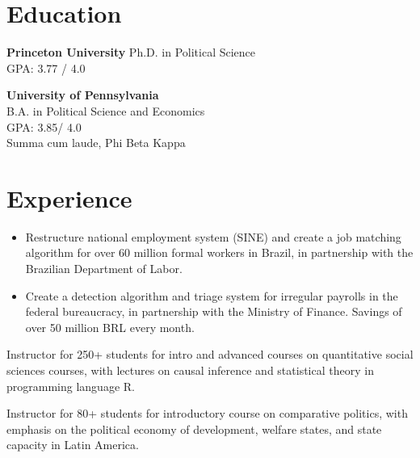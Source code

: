 \documentclass[]{deedy-resume-openfont}
\begin{document}
%
%

%
%

\section{Education}
\textbf{Princeton University}
Ph.D. in Political Science\\
GPA: 3.77 / 4.0
\sectionsep
    
\textbf{University of Pennsylvania}\\
B.A. in Political Science and Economics\\
GPA: 3.85/ 4.0\\
Summa cum laude, Phi Beta Kappa
\sectionsep
    

\section{Experience}
\vspace{\topsep} %
\begin{itemize}
\item Restructure national employment system (SINE) and create a job matching algorithm for over 60 million formal workers in Brazil, in partnership with the Brazilian Department of Labor.
\item Create a detection algorithm and triage system for irregular payrolls in the federal bureaucracy, in partnership with the Ministry of Finance. Savings of over 50 million BRL every month.
\end{itemize}
\sectionsep

\begin{tightemize}
\item Instructor for 250+ students for intro and advanced courses on quantitative social sciences courses, with lectures on causal inference and statistical theory in programming language R.
\item Instructor for 80+ students for introductory course on comparative politics, with emphasis on the political economy of development, welfare states, and state capacity in Latin America.
\end{tightemize}
\sectionsep
\end{document}
